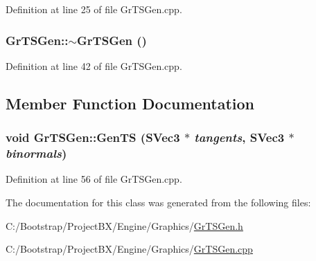 Definition at line 25 of file GrTSGen.cpp.\hypertarget{class_gr_t_s_gen_ebfb1071b62919c32268d627000d232c}{
\subsubsection[{$\sim$GrTSGen}]{\setlength{\rightskip}{0pt plus 5cm}GrTSGen::$\sim$GrTSGen ()}}
\label{class_gr_t_s_gen_ebfb1071b62919c32268d627000d232c}




Definition at line 42 of file GrTSGen.cpp.

\subsection{Member Function Documentation}
\hypertarget{class_gr_t_s_gen_785ea2f7c4d37485f83c5de4e6de5306}{
\subsubsection[{GenTS}]{\setlength{\rightskip}{0pt plus 5cm}void GrTSGen::GenTS ({\bf SVec3} $\ast$ {\em tangents}, \/  {\bf SVec3} $\ast$ {\em binormals})}}
\label{class_gr_t_s_gen_785ea2f7c4d37485f83c5de4e6de5306}




Definition at line 56 of file GrTSGen.cpp.

The documentation for this class was generated from the following files:\begin{CompactItemize}
\item 
C:/Bootstrap/ProjectBX/Engine/Graphics/\hyperlink{_gr_t_s_gen_8h}{GrTSGen.h}\item 
C:/Bootstrap/ProjectBX/Engine/Graphics/\hyperlink{_gr_t_s_gen_8cpp}{GrTSGen.cpp}\end{CompactItemize}
